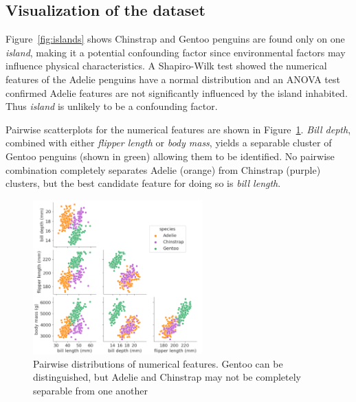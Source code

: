 \documentclass[a4paper, 11pt]{article}
\begin{document}
\subsection*{Visualization of the dataset}

Figure~\ref{fig:islands} shows Chinstrap and Gentoo penguins are found only on one \textit{island}, making it a potential confounding factor since 
environmental factors may influence physical characteristics. A Shapiro-Wilk test showed  
the numerical features of the Adelie penguins have a normal distribution and an ANOVA test confirmed Adelie features are not 
significantly influenced by the island inhabited. Thus \textit{island} is unlikely to be a confounding factor.

Pairwise scatterplots for the numerical features are shown in Figure~\ref{fig:pairwise}. 
\textit{Bill depth}, combined with either \textit{flipper length} or \textit{body mass}, 
yields a separable cluster of Gentoo penguins (shown in green) allowing them to be identified. 
No pairwise combination completely separates Adelie (orange) from Chinstrap (purple) clusters, 
but the best candidate feature for doing so is \textit{bill length}.

\begin{figure} %
  \centering
  \vspace{-1\baselineskip} %
  \includegraphics[width=0.58\textwidth]{pairwise.png} %
  \vspace{-1.5\baselineskip} %
  \caption{\centering\linespread{0.8}\selectfont Pairwise distributions of numerical features. Gentoo can be distinguished, 
  but Adelie and Chinstrap may not be completely separable from one another}
  \vspace{-2.5\baselineskip} %
  \label{fig:pairwise}
\end{figure}
\end{document}
